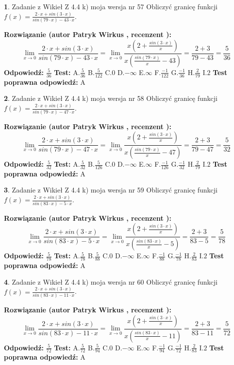 \documentclass[12pt, a4paper]{article}
\theoremstyle{definition} %
\newtheorem{zad}{}
\newcommand{\zadStart}[1]{\begin{zad}#1\newline}
\newcommand{\zadStop}{\end{zad}}
\newcommand{\rozwStart}[2]{\noindent \textbf{Rozwiązanie (autor #1 , recenzent #2): }\newline}
\newcommand{\rozwStop}{\newline}
\newcommand{\odpStart}{\noindent \textbf{Odpowiedź:}\newline}
\newcommand{\odpStop}{\newline}
\newcommand{\testStart}{\noindent \textbf{Test:}\newline}
\newcommand{\testStop}{\newline}
\newcommand{\kluczStart}{\noindent \textbf{Test poprawna odpowiedź:}\newline}
\newcommand{\kluczStop}{\newline}
\begin{document}
\zadStart{Zadanie z Wikieł Z 4.4 k) moja wersja nr 57}
Obliczyć granicę funkcji $f(x)=\frac{2\cdot x +sin(3\cdot x)}{sin(79\cdot x) -43\cdot x}$.
\zadStop
\rozwStart{Patryk Wirkus}{}
$$\lim\limits_{x\to 0}\frac{2\cdot x +sin(3\cdot x)}{sin(79\cdot x) -43\cdot x}
=\lim\limits_{x\to 0}\frac{x(2+\frac{sin(3\cdot x)}{x})}{x(\frac{sin(79\cdot x)}{x}-43)}
=\frac{2+3}{79-43} = \frac{5}{36}$$
\rozwStop
\odpStart
$\frac{5}{36}$
\odpStop
\testStart
A.$\frac{5}{36}$
B.$\frac{5}{122}$
C.$0$
D.$-\infty$
E.$\infty$
F.$\frac{-1}{122}$
G.$\frac{-1}{36}$
H.$\frac{2}{79}$
I.$2$
\testStop
\kluczStart
A
\kluczStop



\zadStart{Zadanie z Wikieł Z 4.4 k) moja wersja nr 58}
Obliczyć granicę funkcji $f(x)=\frac{2\cdot x +sin(3\cdot x)}{sin(79\cdot x) -47\cdot x}$.
\zadStop
\rozwStart{Patryk Wirkus}{}
$$\lim\limits_{x\to 0}\frac{2\cdot x +sin(3\cdot x)}{sin(79\cdot x) -47\cdot x}
=\lim\limits_{x\to 0}\frac{x(2+\frac{sin(3\cdot x)}{x})}{x(\frac{sin(79\cdot x)}{x}-47)}
=\frac{2+3}{79-47} = \frac{5}{32}$$
\rozwStop
\odpStart
$\frac{5}{32}$
\odpStop
\testStart
A.$\frac{5}{32}$
B.$\frac{5}{126}$
C.$0$
D.$-\infty$
E.$\infty$
F.$\frac{-1}{126}$
G.$\frac{-1}{32}$
H.$\frac{2}{79}$
I.$2$
\testStop
\kluczStart
A
\kluczStop



\zadStart{Zadanie z Wikieł Z 4.4 k) moja wersja nr 59}
Obliczyć granicę funkcji $f(x)=\frac{2\cdot x +sin(3\cdot x)}{sin(83\cdot x) -5\cdot x}$.
\zadStop
\rozwStart{Patryk Wirkus}{}
$$\lim\limits_{x\to 0}\frac{2\cdot x +sin(3\cdot x)}{sin(83\cdot x) -5\cdot x}
=\lim\limits_{x\to 0}\frac{x(2+\frac{sin(3\cdot x)}{x})}{x(\frac{sin(83\cdot x)}{x}-5)}
=\frac{2+3}{83-5} = \frac{5}{78}$$
\rozwStop
\odpStart
$\frac{5}{78}$
\odpStop
\testStart
A.$\frac{5}{78}$
B.$\frac{5}{88}$
C.$0$
D.$-\infty$
E.$\infty$
F.$\frac{-1}{88}$
G.$\frac{-1}{78}$
H.$\frac{2}{83}$
I.$2$
\testStop
\kluczStart
A
\kluczStop



\zadStart{Zadanie z Wikieł Z 4.4 k) moja wersja nr 60}
Obliczyć granicę funkcji $f(x)=\frac{2\cdot x +sin(3\cdot x)}{sin(83\cdot x) -11\cdot x}$.
\zadStop
\rozwStart{Patryk Wirkus}{}
$$\lim\limits_{x\to 0}\frac{2\cdot x +sin(3\cdot x)}{sin(83\cdot x) -11\cdot x}
=\lim\limits_{x\to 0}\frac{x(2+\frac{sin(3\cdot x)}{x})}{x(\frac{sin(83\cdot x)}{x}-11)}
=\frac{2+3}{83-11} = \frac{5}{72}$$
\rozwStop
\odpStart
$\frac{5}{72}$
\odpStop
\testStart
A.$\frac{5}{72}$
B.$\frac{5}{94}$
C.$0$
D.$-\infty$
E.$\infty$
F.$\frac{-1}{94}$
G.$\frac{-1}{72}$
H.$\frac{2}{83}$
I.$2$
\testStop
\kluczStart
A
\kluczStop
\end{document}
